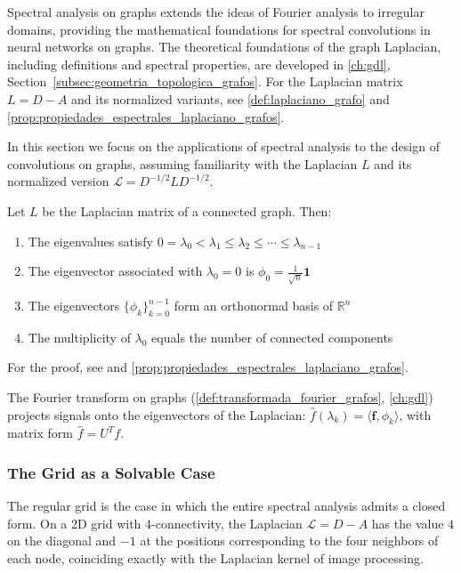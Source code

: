 Spectral analysis on graphs extends the ideas of Fourier analysis to irregular domains, providing the mathematical foundations for spectral convolutions in neural networks on graphs. The theoretical foundations of the graph Laplacian, including definitions and spectral properties, are developed in \autoref{ch:gdl}, Section~\ref{subsec:geometria_topologica_grafos}. For the Laplacian matrix $L = D - A$ and its normalized variants, see \autoref{def:laplaciano_grafo} and \autoref{prop:propiedades_espectrales_laplaciano_grafos}.

In this section we focus on the applications of spectral analysis to the design of convolutions on graphs, assuming familiarity with the Laplacian $L$ and its normalized version $\mathcal{L} = D^{-1/2} L D^{-1/2}$.

\begin{theorem}\label{thm:espectral_laplaciano}
Let $L$ be the Laplacian matrix of a connected graph. Then:
\begin{enumerate}
    \item The eigenvalues satisfy $0 = \lambda_0 < \lambda_1 \leq \lambda_2 \leq \cdots \leq \lambda_{n-1}$
    \item The eigenvector associated with $\lambda_0 = 0$ is $\phi_0 = \frac{1}{\sqrt{n}} \mathbf{1}$
    \item The eigenvectors $\{\phi_k\}_{k=0}^{n-1}$ form an orthonormal basis of $\mathbb{R}^n$
    \item The multiplicity of $\lambda_0$ equals the number of connected components
\end{enumerate}
For the proof, see \citep[Chapters~1--2]{Chung1997} and \autoref{prop:propiedades_espectrales_laplaciano_grafos}.
\end{theorem}

The Fourier transform on graphs (\autoref{def:transformada_fourier_grafos}, \autoref{ch:gdl}) projects signals onto the eigenvectors of the Laplacian: $\hat{f}(\lambda_k) = \langle \mathbf{f}, \phi_k \rangle$, with matrix form $\hat{f} = U^T f$.

\subsubsection{The Grid as a Solvable Case}

The regular grid is the case in which the entire spectral analysis admits a closed form. On a 2D grid with 4-connectivity, the Laplacian $\mathcal{L} = D - A$ has the value $4$ on the diagonal and $-1$ at the positions corresponding to the four neighbors of each node, coinciding exactly with the Laplacian kernel of image processing.

